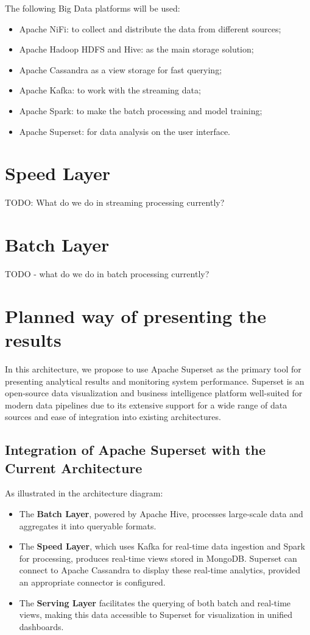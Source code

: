 \documentclass[12pt,a4paper, hidelinks]{article}
\begin{document}
The following Big Data platforms will be used:
\begin{itemize}
    \item Apache NiFi: to collect and distribute the data from different sources;
    \item Apache Hadoop HDFS and Hive: as the main storage solution;
    \item Apache Cassandra as a view storage for fast querying;
    \item Apache Kafka: to work with the streaming data;
    \item Apache Spark: to make the batch processing and model training;
    \item Apache Superset: for data analysis on the user interface.
\end{itemize}

\section{Speed Layer}
TODO: What do we do in streaming processing currently?


\section{Batch Layer}
TODO - what do we do in batch processing currently?



\section{Planned way of presenting the results}

In this architecture, we propose to use Apache Superset as the primary tool for presenting analytical results and monitoring system performance. Superset is an open-source data visualization and business intelligence platform well-suited for modern data pipelines due to its extensive support for a wide range of data sources and ease of integration into existing architectures.

\subsection{Integration of Apache Superset with the Current Architecture}
As illustrated in the architecture diagram:
\begin{itemize}
    \item The \textbf{Batch Layer}, powered by Apache Hive, processes large-scale data and aggregates it into queryable formats.
    \item The \textbf{Speed Layer}, which uses Kafka for real-time data ingestion and Spark for processing, produces real-time views stored in MongoDB. Superset can connect to Apache Cassandra to display these real-time analytics, provided an appropriate connector is configured.
    \item The \textbf{Serving Layer} facilitates the querying of both batch and real-time views, making this data accessible to Superset for visualization in unified dashboards.
\end{itemize}
\end{document}
